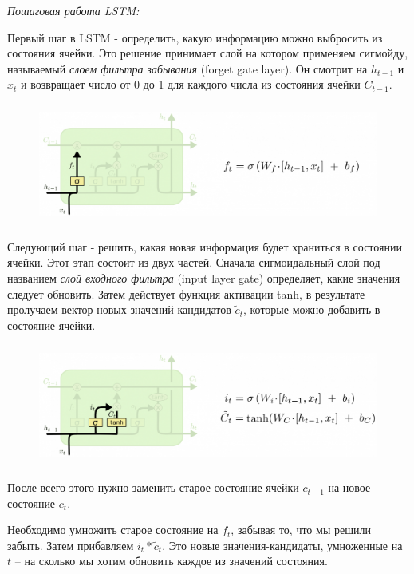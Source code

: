     \textit{Пошаговая работа LSTM:}
    
    Первый шаг в LSTM - определить, какую информацию можно выбросить из состояния ячейки. Это решение принимает слой на котором применяем сигмойду, называемый \textit{слоем фильтра забывания} (forget gate layer). Он смотрит на $h_{t-1}$ и $x_t$ и возвращает число от 0 до 1 для каждого числа из состояния ячейки $C_{t-1}$.
    
    \begin{figure}[ht!]
		\centering
		\captionsetup{justification=centering}
		\includegraphics[height=40mm]{img/LSTM_step1.png}
	\end{figure}
	
	Следующий шаг - решить, какая новая информация будет храниться в состоянии ячейки. Этот этап состоит из двух частей. Сначала сигмоидальный слой под названием \textit{слой входного фильтра} (input layer gate) определяет, какие значения следует обновить. Затем действует функция активации tanh, в результате пролучаем вектор новых значений-кандидатов $\tilde{c}_t$, которые можно добавить в состояние ячейки.
    
    \begin{figure}[ht!]
		\centering
		\captionsetup{justification=centering}
		\includegraphics[height=40mm]{img/LSTM_step2.png}
	\end{figure}
	
    После всего этого нужно заменить старое состояние ячейки $c_{t-1}$ на новое состояние $c_t$.
    
    Необходимо умножить старое состояние на $f_t$, забывая то, что мы решили забыть. Затем прибавляем $i_t*\tilde{c}_t$. Это новые значения-кандидаты, умноженные на $t$ – на сколько мы хотим обновить каждое из значений состояния.
    
